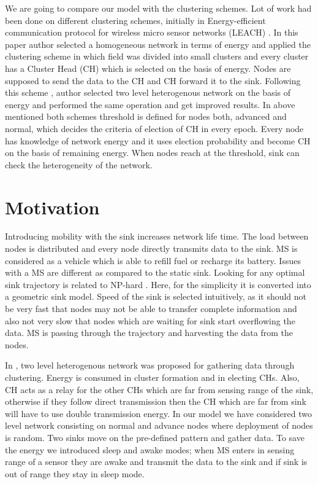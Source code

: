 \documentclass[conference]{IEEEtran}
\begin{document}
We are going to compare our model with the clustering schemes. Lot of work had been done on different clustering schemes, initially in Energy-efficient communication protocol for wireless micro sensor networks (LEACH) \cite {11}. In this paper author selected a homogeneous network in terms of energy and applied the clustering scheme in which field was divided into small clusters and every cluster has a Cluster Head (CH) which is selected on the basis of energy. Nodes are supposed to send the data to the CH and CH forward it to the sink. Following this scheme \cite {12}, author selected two level heterogenous network on the basis of energy and performed the same operation and get improved results. In above mentioned both schemes threshold is defined for nodes both, advanced and normal, which decides the criteria of election of CH in every epoch. Every node has knowledge of network energy and it uses election probability and become CH on the basis of remaining energy. When nodes reach at the threshold, sink can check the heterogeneity of the network.

\section{Motivation}
Introducing mobility with the sink increases network life time. The load between nodes is distributed and every node directly transmits data to the sink. MS is considered as a vehicle which is able to refill fuel or recharge its battery. Issues with a MS are different as compared to the static sink. Looking for any optimal sink trajectory is related to NP-hard \cite {13}. Here, for the simplicity it is converted into a geometric sink model. Speed of the sink is selected intuitively, as it should not be very fast that nodes may not be able to transfer complete information and also not very slow that nodes which are waiting for sink start overflowing the data. MS is passing through the trajectory and harvesting the data from the nodes.

In \cite{12}, two level heterogenous network was proposed for gathering data through clustering. Energy is consumed in cluster formation and in electing CHs. Also, CH acts as a relay for the other CHs which are far from sensing range of the sink, otherwise if they follow direct transmission then the CH which are far from sink will have to use double transmission energy. In our model we have considered two level network consisting on normal and advance nodes where deployment of nodes is random. Two sinks move on the pre-defined pattern and gather data. To save the energy we introduced sleep and awake modes; when MS enters in sensing range of a sensor they are awake and transmit the data to the sink and if sink is out of range they stay in sleep mode.
\end{document}
